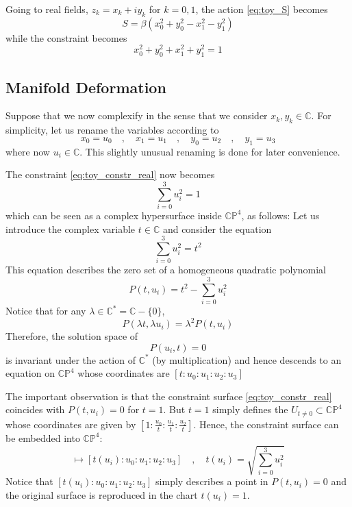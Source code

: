 \documentclass[a4paper,11pt]{article}
\theoremstyle{definition}
\newcommand{\CC}{\mathbb{C}}
\newcommand{\CP}{\mathbb{CP}}
\begin{document}
Going to real fields, $z_k = x_k + i y_k$ for $k = 0,1$, the action \eqref{eq:toy_S} becomes 
\begin{equation}
  S = \beta\left( x_0^2 + y_0^2 - x_1^2 - y_1^2 \right)
  \label{eq:toy_S_real}
\end{equation}
while the constraint becomes
\begin{equation}
  x_0^2 + y_0^2 + x_1^2 + y_1^2 = 1
  \label{eq:toy_constr_real}
\end{equation}

\subsection{Manifold Deformation}
Suppose that we now complexify in the sense that we consider $x_k, y_k \in \CC$.
For simplicity, let us rename the variables according to 
\begin{equation}
  x_0 = u_0 \quad , \quad x_1 = u_1 \quad , \quad  y_0 = u_2 \quad , \quad y_1 = u_3
\end{equation}
where now $u_i \in \CC$.
This slightly unusual renaming is done for later convenience.

The constraint \eqref{eq:toy_constr_real} now becomes
\begin{equation}
  \sum_{i=0}^3 u_i^2 = 1
\end{equation}
which can be seen as a complex hypersurface inside $\CP^4$, as follows: Let us introduce the complex variable $t \in \CC$ and consider the equation 
\begin{equation}
  \sum_{i=0}^3 u_i^2 = t^2
\end{equation}
This equation describes the zero set of a homogeneous quadratic polynomial 
\begin{equation}
  P(t,u_i) = t^2 - \sum_{i=0}^3 u_i^2
\end{equation}
Notice that for any $\lambda \in \CC^* = \CC - \{ 0 \}$,
\begin{equation}
  P(\lambda t, \lambda u_i) = \lambda^2 P(t,u_i)
\end{equation}
Therefore, the solution space of 
\begin{equation}
  P(u_i,t) = 0
\end{equation}
is invariant under the action of $\CC^*$ (by multiplication) and hence descends to an equation on $\CP^4$ whose coordinates are $[t:u_0:u_1:u_2:u_3]$

The important observation is that the constraint surface \eqref{eq:toy_constr_real} coincides with $P(t,u_i) = 0$ for $t=1$.
But $t=1$ simply defines the $U_{t \neq 0} \subset \CP^4$ whose coordinates are given by $\left[ 1:\tfrac{u_0}{t}:\tfrac{u_1}{t}:\tfrac{u_2}{t}\right]$.
Hence, the constraint surface can be embedded into $\CP^4$:
\begin{equation}
  [u_0:u_1:u_2:u_3] \mapsto [t(u_i):u_0:u_1:u_2:u_3] \quad , \quad t(u_i) = \sqrt{\sum_{i=0}^3 u_i^2} 
  \label{eq:toy_emb}
\end{equation}
Notice that $[t(u_i):u_0:u_1:u_2:u_3]$ simply describes a point in $P(t,u_i) = 0$ and the original surface is reproduced in the chart $t(u_i) = 1$.  
\end{document}
